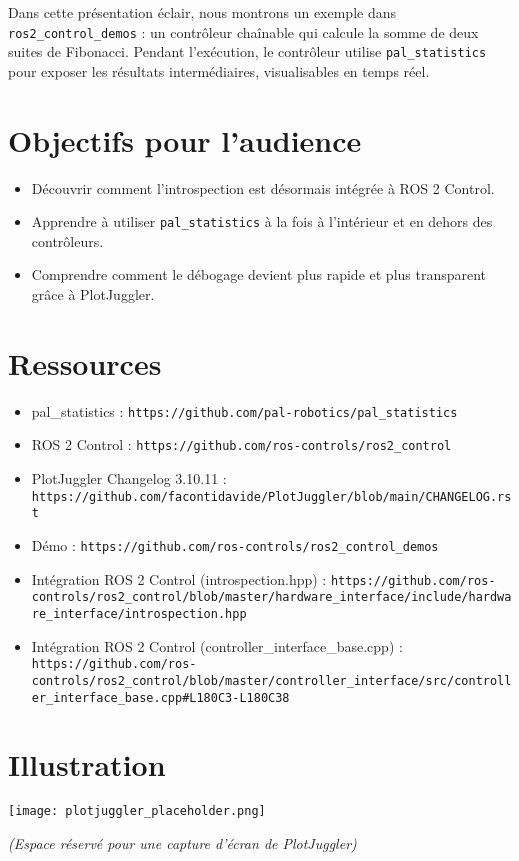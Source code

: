 \documentclass[11pt,a4paper]{article}
\begin{document}
Dans cette présentation éclair, nous montrons un exemple dans \texttt{ros2\_control\_demos} : un contrôleur chaînable qui calcule la somme de deux suites de Fibonacci. Pendant l'exécution, le contrôleur utilise \texttt{pal\_statistics} pour exposer les résultats intermédiaires, visualisables en temps réel.  

\section*{Objectifs pour l'audience}
\begin{itemize}
  \item Découvrir comment l'introspection est désormais intégrée à ROS 2 Control.
  \item Apprendre à utiliser \texttt{pal\_statistics} à la fois à l'intérieur et en dehors des contrôleurs.
  \item Comprendre comment le débogage devient plus rapide et plus transparent grâce à PlotJuggler.
\end{itemize}

\section*{Ressources}
\begin{itemize}
  \item pal\_statistics : \texttt{https://github.com/pal-robotics/pal\_statistics}
  \item ROS 2 Control : \texttt{https://github.com/ros-controls/ros2\_control}
  \item PlotJuggler Changelog 3.10.11 : \texttt{https://github.com/facontidavide/PlotJuggler/blob/main/CHANGELOG.rst}
  \item Démo : \texttt{https://github.com/ros-controls/ros2\_control\_demos}
  \item Intégration ROS 2 Control (introspection.hpp) : \texttt{https://github.com/ros-controls/ros2\_control/blob/master/hardware\_interface/include/hardware\_interface/introspection.hpp}
  \item Intégration ROS 2 Control (controller\_interface\_base.cpp) : \texttt{https://github.com/ros-controls/ros2\_control/blob/master/controller\_interface/src/controller\_interface\_base.cpp\#L180C3-L180C38}
\end{itemize}

\section*{Illustration}
\begin{center}
\texttt{[image: plotjuggler\_placeholder.png]}
\end{center}
\textit{(Espace réservé pour une capture d'écran de PlotJuggler)}
\end{document}
